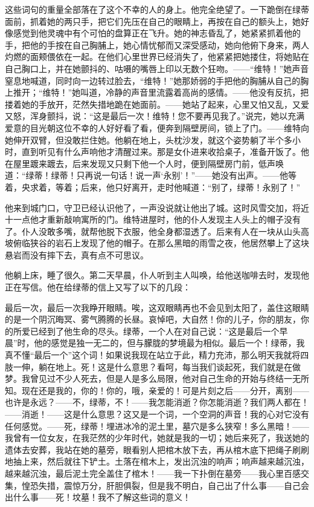 \documentclass[12pt,oneside]{book}
\begin{document}
\begin{framed}
这些词句的重量全部落在了这个不幸的人的身上。他完全绝望了。一下跪倒在绿蒂面前，抓着她的两只手，把它们先压在自己的眼睛上，再按在自己的额头上，她好像感觉到他灵魂中有个可怕的盘算正在飞升。她的神志昏乱了，她紧紧抓着他的手，把他的手按在自己胸脯上，她心情忧郁而又深受感动，她向他俯下身来，两人灼燃的面颊偎依在一起。在他们心里世界已经消失了，他紧紧把她搂住，将她贴在自己胸口上，并在她颤抖的、咕嗫的嘴唇上印以无数个狂吻。——“维特！”她声音窒息地喊道，同时向一边转过脸去，“维特！”她那娇弱的手把他的胸脯从自己的胸上推开；“维特！”她叫道，冷静的声音里流露着高尚的感情。——他没有反抗，把搂着她的手放开，茫然失措地跪在她面前。——她站了起来，心里又怕又乱，又爱又怒，浑身颤抖，说：“这是最后一次！维特！您不要再见我了。”说完，她以充满爱意的目光朝这位不幸的人好好看了看，便奔到隔壁房间，锁上了门。——维特向她伸开双臂，但没敢拦住她。他躺在地上，头枕沙发，就这个姿势躺了半个多小时，直到听见有什么声响他才清醒过来。那是女仆进来收拾桌子，准备开饭了。他在屋里踱来踱去，后来发现又只剩下他一个人时，便到隔壁房门前，低声唤道：“绿蒂！绿蒂！只再说一句话！说一声‘永别’！”——她没有出声。——他等着，央求着，等着；后来，他只好离开，走时他喊道：“别了，绿蒂！永别了！”

他来到城门口，守卫已经认识他了，一声没说就让他出了城。这时风雪交加，将近十一点他才重新敲响寓所的门。维特进屋时，他的仆人发现主人头上的帽子没有了。仆人没敢多嘴，就帮他脱下衣服，他全身都湿透了。后来有人在一块从山头高坡俯临狭谷的岩石上发现了他的帽子。在那么黑暗的雨雪之夜，他居然攀上了这块悬岩而没有摔下去，真有点不可思议。

他躺上床，睡了很久。第二天早晨，仆人听到主人叫唤，给他送咖啡去时，发现他正在写信。他在给绿蒂的信上又写了以下的几段：
\end{framed}

最后一次，最后一次我睁开眼睛。唉，这双眼睛再也不会见到太阳了，盖住这眼睛的是一个阴沉晦冥、雾气腾腾的长昼。哀悼吧，大自然！你的儿子，你的朋友，你的所爱已经到了他生命的尽头。绿蒂，一个人在对自己说：“这是最后一个早晨”时，他的感觉是独一无二的，但与朦胧的梦境最为相似。最后一个！绿蒂，我真不懂“最后一个”这个词！如果说我现在站立于此，精力充沛，那么明天我就将四肢一伸，躺在地上。死！这是什么意思？看呵，每当我们谈起死，我们就是在做梦。我曾见过不少人死去，但是人是多么局限，他对自己生命的开始与终结一无所知。现在还是我的，你的！你的，哦，亲爱的！可是片刻之后——分开，离别——也许是永远？——不，绿蒂，不！——我怎能消逝？你怎能消逝？我们两人都在！——消逝！——这是什么意思？这又是一个词，一个空洞的声音！我的心对它没有任何感觉。——死，绿蒂！埋进冰冷的泥土里，墓穴是多么狭窄！多么黑暗！——我曾有一位女友，在我茫然的少年时代，她就是我的一切；她后来死了，我送她的遗体去安葬，我站在她的墓旁，眼看别人把棺木放下去，再从棺木底下把绳子刷刷地抽上来，然后就往下铲土。土落在棺木上，发出沉浊的响声；响声越来越沉浊，越来越沉浊，最后泥土完全盖住了棺木！——我一下扑倒在墓旁——我心里百感交集，惶恐失措，震惊万分，肝胆俱裂，但是我不明白，自己出了什么事——自己会出什么事——死！坟墓！我不了解这些词的意义！
\end{document}
